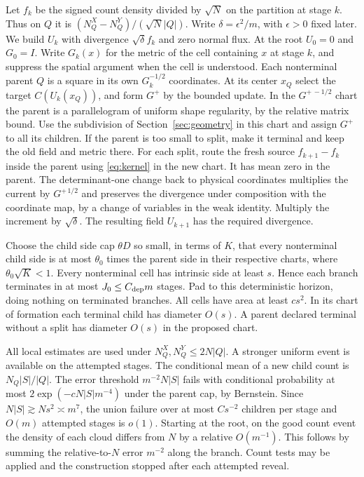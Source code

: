 \documentclass[11pt]{article}
\begin{document}
Let \(f_k\) be the signed count density divided by \(\sqrt N\)
on the partition at stage \(k\). Thus on \(Q\) it is
\((N_Q^X-N_Q^Y)/(\sqrt N|Q|)\).
Write \(\delta=\epsilon^2/m\), with \(\epsilon>0\) fixed later.
We build \(U_k\) with divergence \(\sqrt\delta f_k\) and zero
normal flux. At the root \(U_0=0\) and \(G_0=I\).
Write \(G_k(x)\) for the metric of the cell containing \(x\) at stage
\(k\), and suppress the spatial argument when the cell is understood.
Each nonterminal parent \(Q\) is a square in its own
\(G_k^{-1/2}\) coordinates. At its center \(x_Q\) select the
target \(C(U_k(x_Q))\), and form \(G^+\) by the bounded update.
In the \(G^{+\,-1/2}\) chart the parent is a parallelogram of
uniform shape regularity, by the relative matrix bound.
Use the subdivision of Section~\ref{sec:geometry} in this chart and assign \(G^+\)
to all its children. If the parent is too small to split,
make it terminal and keep the old field and metric there.
For each split, route the fresh source \(f_{k+1}-f_k\)
inside the parent using \eqref{eq:kernel} in the new chart.
It has mean zero in the parent. The determinant-one change
back to physical coordinates multiplies the current by
\(G^{+\,1/2}\) and preserves the divergence under composition
with the coordinate map, by a change of variables in the
weak identity. Multiply the increment by \(\sqrt\delta\).
The resulting field \(U_{k+1}\) has the required divergence.

Choose the child side cap \(\theta D\) so small, in terms
of \(K\), that every nonterminal child side is at most
\(\theta_0\) times the parent side in their respective
charts, where \(\theta_0\sqrt K<1\). Every nonterminal
cell has intrinsic side at least \(s\). Hence each branch
terminates in at most \(J_0\le C_{\rm dep}m\) stages.
Pad to this deterministic horizon, doing nothing on
terminated branches. All cells have area at least \(c s^2\).
In its chart of formation each terminal child has diameter
\(O(s)\). A parent declared terminal without a split has
diameter \(O(s)\) in the proposed chart.

All local estimates are used under
\(N_Q^X,N_Q^Y\le2N|Q|\). A stronger uniform event is
available on the attempted stages. The conditional mean of
a new child count is \(N_Q |S|/|Q|\). The error threshold
\(m^{-2}N|S|\) fails with conditional probability at most
\(2\exp(-cN|S|m^{-4})\) under the parent cap, by Bernstein.
Since \(N|S|\gtrsim Ns^2\asymp m^7\), the union failure
over at most \(Cs^{-2}\) children per stage and \(O(m)\)
attempted stages is \(o(1)\).
Starting at the root, on the good count event the density
of each cloud differs from \(N\) by a relative \(O(m^{-1})\).
This follows by summing the relative-to-\(N\) error
\(m^{-2}\) along the branch. Count tests may be applied
and the construction stopped after each attempted reveal.
\end{document}
